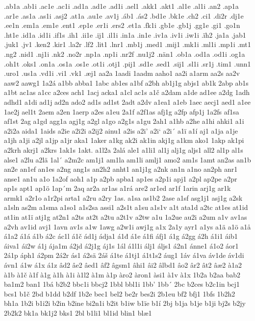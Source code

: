 .ab1a
.ab1i
.ac1e
.ac1i
.ad1a
.ad1e
.ad1i
.ael1
.akk1
.akt1
.al1e
.al1i
.an2
.ap1a
.ar1e
.as1a
.as1i
.asj2
.at1a
.au1e
.av1j
.áb1
.ás2
.bd1e
.bk1e
.ch2
.ci1
.di2r
.dj1e
.ee1n
.em1a
.em1e
.ent1
.ep1e
.er1i
.ers2
.et1a
.fk1i
.gb1e
.gb1j
.gg1e
.gi1
.go1n
.ht1e
.id1a
.id1i
.if1s
.ih1
.ii1e
.ij1
.il1i
.in1a
.in1e
.iv1a
.iv1i
.iw1i
.ïh2
.ja1a
.jab1
.juk1
.jv1
.ken2
.kir1
.la2r
.lf2
.lit1
.lnr1
.mb1j
.med1
.mij1
.mk1i
.ml1i
.mp1i
.mt1
.ng2
.nid1
.nj1i
.nk2
.no2r
.np1a
.np1i
.nr2f
.nu1j2
.nän1
.ob1a
.od1a
.od1i
.og1a
.oh1t
.oks1
.on1a
.os1a
.os1e
.ot1i
.otj1
.pij1
.sd1e
.sed1
.sij1
.sl1i
.sr1j
.tim1
.unn1
.uro1
.us1a
.vd1i
.vi1
.vk1
.æj1
aa2a
1aadi
1aadm
aaho1
aa2i
a1arm
aa2s
aa2v
aaw2
aawg1
1a2á
a1bb
abba1
1abc
ab1es
a1bf
a2bh
ab1j1g
abjs1
ab1k
2abp
ab1s
a1bt
ac1as
a1cc
a2ces
ach1
1acj
acka1
a1cl
ac1s
a1č
a2dam
a1de
ad1ee
a2dg
1adh
adhd1
a1di
ad1j
ad2n
ado2
ad1s
ad1st
2adt
a2dv
a1ea1
a1eb
1aec
aecj1
aed1
a1ee
1ae2j
ael1t
2aem
a2en
1aerp
a2es
a1eu
2a1f
a2f1as
afj1g
a2fp
afp1j
1a2fs
af1sa
af1st
2ag
a1gd
agg1a
agj1g
a2gl
a1go
a2g1s
a1gu
2ah1
a1hb
a2he
a1hi
ahki1
a1i
a2i2a
aida1
1aids
a2ie
a2i2i
a2ij2
ainu1
a2is
a2i'
a2i`
a2i´
a1ï
a1í
aj1
a1ja
a1je
a1jh
a1ji
a2jl
a1jp
a1jr
aka1
1aker
a1kg
ak2i
ak1in
akj1g
a1km
ako1
1akp
ak1pi
a2krh
akrj1
a2krs
1ak1s
1akt.
a1l2a
2alá
ale1
a1li1
al1j
alj1g
aljs1
all2
al1p
al1s
alse1
a2lu
a2lä
1al´
a2m2c
am1j1
am1la
am1li
amlj1
amo2
am1s
1amt
an2as
an1b
an2e
an1ef
an1es
a2ng
ang1s
an2h2
anht1
an1j1g
a2nk
an1n
a1no
an2ph
anr1
anse1
an1u
a1o
1a2of
aoh1
a1p
a2pb
apba1
ap1es
a2p1i
apj1
a2pl
ap2pe
a2pr
ap1s
apt1
ap1ö
1ap´m
2aq
ar2a
ar1as
a1rá
are2
ar1ed
ar1f
1arin
arj1g
ar1k
armk1
a2r1o
a1r2pi
arta1
a2ru
a2ry
1as.
a1sa
as1b2
2ase
a1sf
asg1j1
asj1g
a2sk
a1sln
as2m
a1sma
a1so1
a1s2sa
assi1
a2s1t
a1su
a1s1v
a1t
ata1d
a2tc
at1es
at1id
at1in
at1ï
atj1g
at2n1
a2ts
at2t
a2tu
a2t1v
a2tw
a1u
1a2ue
au2i
a2um
a1v
av1as
a2vh
av1id
avj1
1avn
av1s
a1w
1awg
a2w1i
awj1g
a1x
2a1y
ayr1
a1ys
a1ä
a1ö
a1å
á1a2
á1á
á1b
á2c
ác1l
á1č
ád1j
ádja1
á1đ
á1e
á1fi
áfj1
á1g
á2gg
á2h
á1i1
áib1
áiva1
ái2w
á1j
ája1m
á2jd
á2j1g
áj1s
1ál
á1l1i
álj1
áljs1
á2n1
ánne1
á1o2
áor1
2á1p
áph1
á2pm
2á2r
ás1
á2sä
2áš
á1te
á1tj1
á1t1s2
áug1
1áv
á1va
áv1de
áv1di
ávn1
á1w
á1x
á1z
âd2
âe2
âed1
âf2
âgsm1
âhi1
âi2
âlbd1
âo2
âr2
ât2
âæ2
à1a2
à1b
à1č
à1f
à1g
à1h
à1i
à1l2
à1m
à1p
àro2
àron1
àsi1
à1v
à1x
1b2a
b2aa
bab2
ba1m2
ban1
1bá
b2b2
bbc1i
bbcj2
1bbl
bbl1i
1bb'
1bb´
2bc
b2ces
b2c1in
bcj1
bcs1
b1č
2bd
b1dd
b2df
1b2e
bec1
bel2
be2r
bes2i
2b1eu
bf2
bfj1
1bfs
1b2h2
bh1a
1b2i
b1i2i
b2in
b2ine
bi2n1i
b2it
b1iw
b1ïe
b1í
2bj
b1ja
b1je
b1ji
bj2s
b2jy
2b2k2
bk1a
bk1j2
bks1
2bl
b1li1
bl1id
blin1
blæ1
